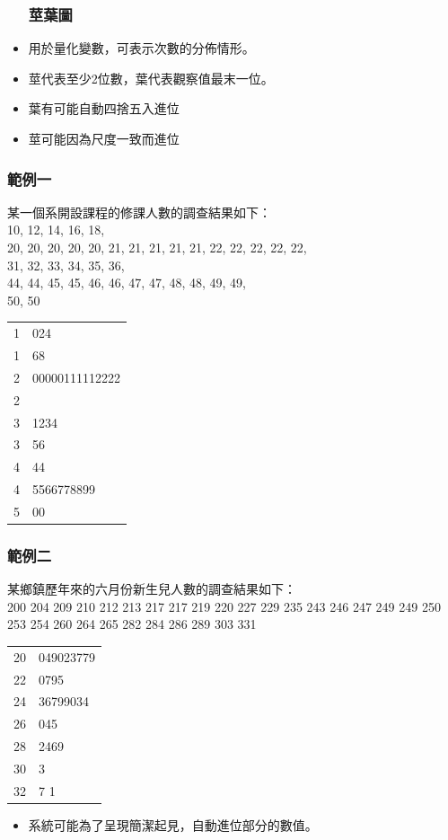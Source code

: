 \documentclass{beamer}
\begin{document}
\begin{frame}
\begin{itemize}\frametitle{莖葉圖}
\item 用於量化變數，可表示次數的分佈情形。
\item 莖代表至少2位數，葉代表觀察值最末一位。
\item 葉有可能自動四捨五入進位
\item 莖可能因為尺度一致而進位
\end{itemize}
\end{frame}
\begin{frame}\frametitle{範例一}
某一個系開設課程的修課人數的調查結果如下：\\
10, 12, 14, 16, 18, \\
20, 20, 20, 20, 20, 21, 21, 21, 21, 21, 22, 22, 22, 22, 22,\\
 31, 32, 33, 34, 35, 36,\\
44, 44, 45, 45, 46, 46, 47, 47, 48, 48, 49, 49, \\
50, 50\\
\bigskip
\begin{tabular}{l|l}
1&024\\
1&68\\
2&00000111112222\\
2 &\\ 
  3 & 1234\\
  3 & 56\\
  4 & 44\\
  4 & 5566778899\\
  5 & 00\\
\end{tabular}
\end{frame}
\begin{frame}\frametitle{範例二}
某鄉鎮歷年來的六月份新生兒人數的調查結果如下：\\
200 204 209 210 212 213 217 217 219 220 227 229 235 243 246 247 249 249 250 253 254 260 264 265 282 284 286 289 303 331\\
\bigskip
\begin{tabular}{l|l}
20  &049023779\\
  22 & 0795\\
  24 & 36799034\\
  26 & 045\\
  28 & 2469\\
  30 & 3\\
  32 &7 1\\
\end{tabular}
\begin{itemize}
\item 系統可能為了呈現簡潔起見，自動進位部分的數值。
\end{itemize}
\end{frame}
\end{document}
